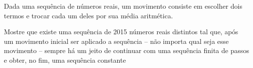 Dada uma sequência de números reais, um movimento consiste em escolher dois termos e trocar cada um deles por sua média aritmética.

Mostre que existe uma sequência de 2015 números reais distintos tal que, após um movimento inicial ser aplicado a sequência -- não importa qual seja esse movimento -- sempre há um jeito de continuar com uma sequência finita de passos e obter, no fim, uma sequência constante
